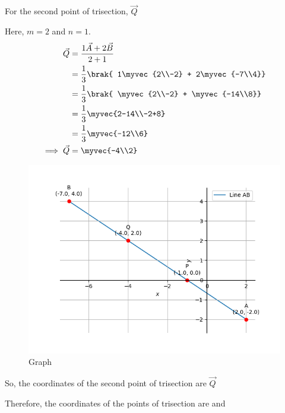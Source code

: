 \documentclass[journal]{IEEEtran}
\begin{document}
For the second point of trisection, $\vec{Q}$ 

Here, $m=2$ and $n=1$.
\begin{align*}
    \vec{Q} &= \frac{1 \vec{A} + 2 \vec{B}}{2+1} \\
      &= \frac{1}{3} \brak{ 1\myvec{2\\-2} + 2\myvec{-7\\4}} \\
      &= \frac{1}{3} \brak{ \myvec{2\\-2} + \myvec{-14\\8}} \\
      &= \frac{1}{3} \myvec{2-14\\-2+8} \\
      &= \frac{1}{3} \myvec{-12\\6} \\
\implies \vec{Q} &= \myvec{-4\\2} 
\end{align*}

\begin{figure}[h]
    \centering
    \includegraphics[width=\columnwidth]{figs/Plot_C.png}
    \caption{Graph}
    \label{fig:fig}
 \end{figure}


So, the coordinates of the second point of trisection are $\vec{Q}$ 

Therefore, the coordinates of the points of trisection are  and 
\end{document}
